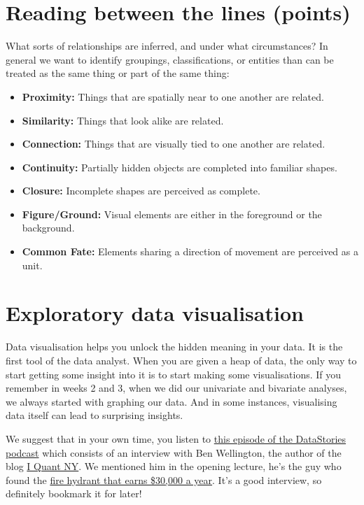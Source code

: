 \documentclass[
]{book}
\providecommand{\tightlist}{%
  \setlength{\itemsep}{0pt}\setlength{\parskip}{0pt}}
\begin{document}
\hypertarget{reading-between-the-lines-points}{%
\section{Reading between the lines (points)}\label{reading-between-the-lines-points}}

What sorts of relationships are inferred, and under what circumstances? In general we want to identify groupings, classifications, or entities than can be treated as the same thing or part of the same thing:

\begin{itemize}
\tightlist
\item
  \textbf{Proximity:} Things that are spatially near to one another are related.
\item
  \textbf{Similarity:} Things that look alike are related.
\item
  \textbf{Connection:} Things that are visually tied to one another are related.
\item
  \textbf{Continuity:} Partially hidden objects are completed into familiar shapes.
\item
  \textbf{Closure:} Incomplete shapes are perceived as complete.
\item
  \textbf{Figure/Ground:} Visual elements are either in the foreground or the background.
\item
  \textbf{Common Fate:} Elements sharing a direction of movement are perceived as a unit.
\end{itemize}

\hypertarget{exploratory-data-visualisation}{%
\section{Exploratory data visualisation}\label{exploratory-data-visualisation}}

Data visualisation helps you unlock the hidden meaning in your data. It is the first tool of the data analyst. When you are given a heap of data, the only way to start getting some insight into it is to start making some visualisations. If you remember in weeks 2 and 3, when we did our univariate and bivariate analyses, we always started with graphing our data. And in some instances, visualising data itself can lead to surprising insights.

We suggest that in your own time, you listen to \href{http://datastori.es/66-iquantnyc/}{this episode of the DataStories podcast} which consists of an interview with Ben Wellington, the author of the blog \href{http://iquantny.tumblr.com/}{I Quant NY}. We mentioned him in the opening lecture, he's the guy who found the \href{https://www.dailymail.co.uk/news/article-2618927/Blurred-lines-How-New-York-fire-hydrant-sees-33-000-flow-city-coffers-parking-fines.html}{fire hydrant that earns \$30,000 a year}. It's a good interview, so definitely bookmark it for later!
\end{document}
